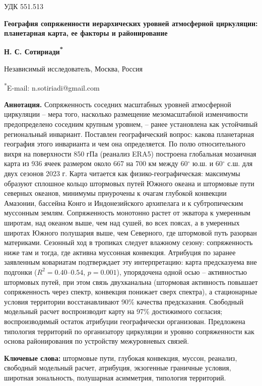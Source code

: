 \documentclass[12pt,a4paper]{article}
\begin{document}
\noindent УДК 551.513

\begin{center}
{\large\bfseries География сопряженности иерархических уровней атмосферной циркуляции: планетарная карта, ее факторы и районирование}

\medskip
{\bfseries Н. С. Сотириади\textsuperscript{*}}

Независимый исследователь, Москва, Россия

\textsuperscript{*}E-mail: n.sotiriadi@gmail.com
\end{center}

\begin{singlespace}
\noindent\textbf{Аннотация.} Сопряженность соседних масштабных уровней атмосферной циркуляции -- мера того, насколько размещение мезомасштабной изменчивости предопределено соседним крупным уровнем, -- ранее установлена как устойчивый региональный инвариант. Поставлен географический вопрос: какова планетарная география этого инварианта и чем она определяется. По полю относительного вихря на поверхности 850 гПа (реанализ ERA5) построена глобальная мозаичная карта из 936 ячеек размером около 667 на 700 км между 60$^\circ$ ю.ш. и 60$^\circ$ с.ш. для двух сезонов 2023 г. Карта читается как физико-географическая: максимумы образуют сплошное кольцо штормовых путей Южного океана и штормовые пути северных океанов, минимумы приурочены к очагам глубокой конвекции Амазонии, бассейна Конго и Индонезийского архипелага и к субтропическим муссонным землям. Сопряженность монотонно растет от экватора к умеренным широтам, над океаном выше, чем над сушей, во всех поясах, а в умеренных широтах Южного полушария выше, чем Северного, где штормовой путь разорван материками. Сезонный ход в тропиках следует влажному сезону: сопряженность ниже там и тогда, где активна муссонная конвекция. Атрибуция по заранее заявленным ковариатам подтверждает эту интерпретацию: карта предсказуема вне подгонки ($R^2 = 0.40$--$0.54$, $p = 0.001$), упорядочена одной осью -- активностью штормовых путей, при этом связь двухканальна (штормовая активность повышает сопряженность через спектр, конвекция понижает сверх спектра), а стационарные условия территории восстанавливают 90\% качества предсказания. Свободный модельный расчет воспроизводит карту на 97\% достижимого согласия; воспроизводимый остаток атрибуции географически организован. Предложена типология территорий по организатору циркуляции и уровню сопряженности как основа районирования по устройству межуровневых связей.

\smallskip
\noindent\textbf{Ключевые слова:} штормовые пути, глубокая конвекция, муссон, реанализ, свободный модельный расчет, атрибуция, экзогенные граничные условия, широтная зональность, полушарная асимметрия, типология территорий.
\end{singlespace}
\end{document}
